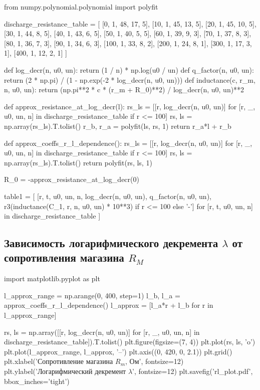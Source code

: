 \documentclass[12pt, a4paper]{article}
\begin{document}
\begin{pycode}
from numpy.polynomial.polynomial import polyfit

discharge_resistance_table = [
  [0, 1, 48, 17, 5],
  [10, 1, 45, 13, 5],
  [20, 1, 45, 10, 5],
  [30, 1, 44, 8, 5],
  [40, 1, 43, 6, 5],
  [50, 1, 40, 5, 5],
  [60, 1, 39, 9, 3],
  [70, 1, 37, 8, 3],
  [80, 1, 36, 7, 3],
  [90, 1, 34, 6, 3],
  [100, 1, 33, 8, 2],
  [200, 1, 24, 8, 1],
  [300, 1, 17, 3, 1],
  [400, 1, 12, 2, 1]
]

def log_decr(n, u0, un):
  return (1 / n) * np.log(u0 / un)
def q_factor(n, u0, un):
  return (2 * np.pi) / (1 - np.exp(-2 * log_decr(n, u0, un)))
def inductance(c, r_m, n, u0, un):
  return (np.pi**2 * c * (r_m + R_0)**2) / log_decr(n, u0, un)**2

def approx_resistance_at_log_decr(l):
  rs_ls = [[r, log_decr(n, u0, un)] for [r, _, u0, un, n] in discharge_resistance_table if r <= 100]
  rs, ls = np.array(rs_ls).T.tolist()
  r_b, r_a = polyfit(ls, rs, 1)
  return r_a*l + r_b

def approx_coeffs_r_l_dependence():
  rs_ls = [[r, log_decr(n, u0, un)] for [r, _, u0, un, n] in discharge_resistance_table if r <= 100]
  rs, ls = np.array(rs_ls).T.tolist()
  return polyfit(rs, ls, 1)

R_0 = -approx_resistance_at_log_decr(0)

table1 = [
  [r, t, u0, un, n, log_decr(n, u0, un), q_factor(n, u0, un), r3(inductance(C_1, r, n, u0, un) * 10**3) if r <= 100 else '-']
  for [r, t, u0, un, n] in discharge_resistance_table
]
\end{pycode}


\subsection*{Зависимость логарифмического декремента $\lambda$ от сопротивления магазина $R_M$}

\begin{pycode}
import matplotlib.pyplot as plt

l_approx_range = np.arange(0, 400, step=1)
l_b, l_a = approx_coeffs_r_l_dependence()
l_approx = [l_a*r + l_b for r in l_approx_range]

rs, ls = np.array([[r, log_decr(n, u0, un)] for [r, _, u0, un, n] in discharge_resistance_table]).T.tolist()
plt.figure(figsize=(7, 4))
plt.plot(rs, ls, 'o')
plt.plot(l_approx_range, l_approx, '--')
plt.axis((0, 420, 0, 2.1))
plt.grid()
plt.xlabel('Сопротивление магазина $R_m$, Ом', fontsize=12)
plt.ylabel('Логарифмический декремент $\lambda$', fontsize=12)
plt.savefig('rl_plot.pdf', bbox_inches='tight')
\end{pycode}
\end{document}
